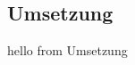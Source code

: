 \documentclass[.../Dokumentation.tex]{subfiles}
\begin{document}
    \subsection{Umsetzung}\label{sec-concept-execution}
    hello from Umsetzung
\end{document}

